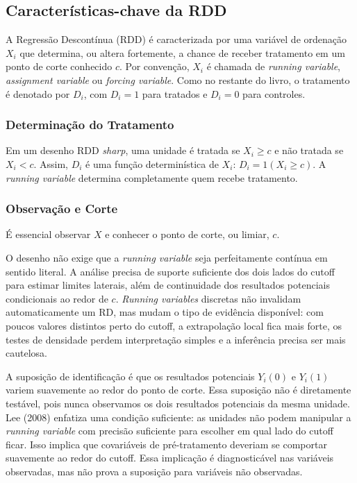 \documentclass[
]{article}
\begin{document}
\subsection{Características-chave da RDD}\label{caracteruxedsticas-chave-da-rdd}

A Regressão Descontínua (RDD) é caracterizada por uma variável de ordenação \(X_i\) que determina, ou altera fortemente, a chance de receber tratamento em um ponto de corte conhecido \(c\). Por convenção, \(X_i\) é chamada de \emph{running variable}, \emph{assignment variable} ou \emph{forcing variable}. Como no restante do livro, o tratamento é denotado por \(D_i\), com \(D_i=1\) para tratados e \(D_i=0\) para controles.

\subsubsection{Determinação do Tratamento}\label{determinauxe7uxe3o-do-tratamento}

Em um desenho RDD \emph{sharp}, uma unidade é tratada se \(X_i \geq c\) e não tratada se \(X_i < c\). Assim, \(D_i\) é uma função determinística de \(X_i\): \(D_i = 1(X_i \geq c)\). A \emph{running variable} determina completamente quem recebe tratamento.

\subsubsection{Observação e Corte}\label{observauxe7uxe3o-e-corte}

É essencial observar \(X\) e conhecer o ponto de corte, ou limiar, \(c\).

O desenho não exige que a \emph{running variable} seja perfeitamente contínua em sentido literal. A análise precisa de suporte suficiente dos dois lados do cutoff para estimar limites laterais, além de continuidade dos resultados potenciais condicionais ao redor de \(c\). \emph{Running variables} discretas não invalidam automaticamente um RD, mas mudam o tipo de evidência disponível: com poucos valores distintos perto do cutoff, a extrapolação local fica mais forte, os testes de densidade perdem interpretação simples e a inferência precisa ser mais cautelosa.

A suposição de identificação é que os resultados potenciais \(Y_i(0)\) e \(Y_i(1)\) variem suavemente ao redor do ponto de corte. Essa suposição não é diretamente testável, pois nunca observamos os dois resultados potenciais da mesma unidade. Lee (2008) enfatiza uma condição suficiente: as unidades não podem manipular a \emph{running variable} com precisão suficiente para escolher em qual lado do cutoff ficar. Isso implica que covariáveis de pré-tratamento deveriam se comportar suavemente ao redor do cutoff. Essa implicação é diagnosticável nas variáveis observadas, mas não prova a suposição para variáveis não observadas.
\end{document}
